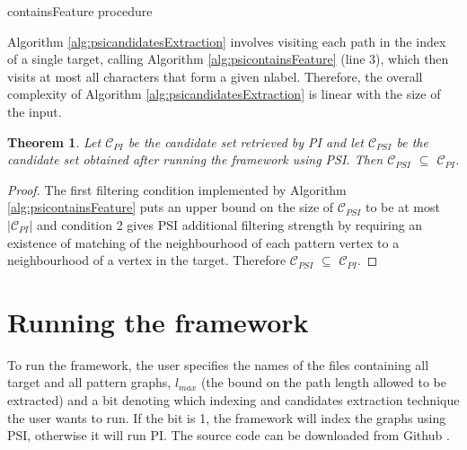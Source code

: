 \documentclass{l4proj}
\newtheorem{theorem}{Theorem}[section]
\newcommand{\fancyC}{\mathcal{C}}
\begin{document}
\begin{algorithm}
\centering
\caption{containsFeature procedure}
\label{alg:psicontainsFeature}
\begin{algorithmic}[1]
  
\EndIf
{} 
\EndIf
{} 
    \EndIf
\EndFor
{}
\EndProcedure
\end{algorithmic}
\end{algorithm}

Algorithm \ref{alg:psicandidatesExtraction} involves visiting each path in the index of a single target, calling Algorithm \ref{alg:psicontainsFeature} (line 3), which then visits at most all characters that form a given nlabel. Therefore, the overall complexity of Algorithm \ref{alg:psicandidatesExtraction} is linear with the size of the input.

\begin{theorem}
\label{psiisbettertheorem}
Let $\fancyC_{PI}$ be the candidate set retrieved by PI and let $\fancyC_{PSI}$ be the candidate set obtained after running the framework using PSI. Then $\fancyC_{PSI}$ $\subseteq$ $\fancyC_{PI}$.
\end{theorem}

\begin{proof}
The first filtering condition implemented by Algorithm \ref{alg:psicontainsFeature} puts an upper bound on the size of $\fancyC_{PSI}$ to be at most $|\fancyC_{PI}|$ and condition 2 gives PSI additional filtering strength by requiring an existence of matching of the neighbourhood of each pattern vertex to a neighbourhood of a vertex in the target. Therefore $\fancyC_{PSI}$ $\subseteq$ $\fancyC_{PI}$. 
\end{proof}

\section{Running the framework}
To run the framework, the user specifies the names of the files containing all target and all pattern graphs, $l_{max}$ (the bound on the path length allowed to be extracted) and a bit denoting which indexing and candidates extraction technique the user wants to run. If the bit is 1, the framework will index the graphs using PSI, otherwise it will run PI. The source code can be downloaded from Github \cite{framework-github}.
\end{document}
